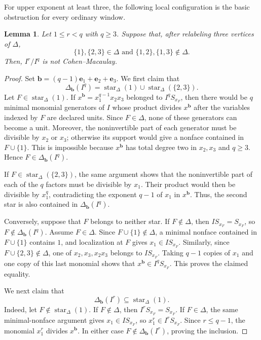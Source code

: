 \documentclass[12pt]{amsart}
\theoremstyle{plain}
\newtheorem{lemma}[theorem]{Lemma}
\theoremstyle{definition}
\theoremstyle{remark}
\begin{document}
For upper exponent at least three, the following local configuration is the
basic obstruction for every ordinary window.

\begin{lemma}\label{lem:three-vertex-obstruction}
Let $1\le r<q$ with $q\ge3$. Suppose that, after relabeling three vertices
of $\Delta$,
$$
\{1\},\{2,3\}\in\Delta
\text{ and }
\{1,2\},\{1,3\}\notin\Delta.
$$
Then, $I^r/I^q$ is not Cohen--Macaulay.
\end{lemma}

\begin{proof}
Set $\mathbf b=(q-1)\mathbf e_1+\mathbf e_2+\mathbf e_3$. We first claim
that
$$
\Delta_{\mathbf b}(I^q)
=
\operatorname{star}_\Delta(1)
\cup
\operatorname{star}_\Delta(\{2,3\}).
$$
Let $F\in\operatorname{star}_\Delta(1)$. If
$x^{\mathbf b}=x_1^{q-1}x_2x_3$ belonged to $I^qS_{x_F}$, then there would
be $q$ minimal monomial generators of $I$ whose product divides
$x^{\mathbf b}$ after the variables indexed by $F$ are declared units.
Since $F\in\Delta$, none of these generators can become a unit. Moreover,
the noninvertible part of each generator must be divisible by $x_2$ or $x_3$;
otherwise its support would give a nonface contained in $F\cup\{1\}$. This is impossible because
$x^{\mathbf b}$ has total degree two in $x_2,x_3$ and $q\ge3$. Hence
$F\in\Delta_{\mathbf b}(I^q)$.

If $F\in\operatorname{star}_\Delta(\{2,3\})$, the same argument shows
that the noninvertible part of each of the $q$ factors must be divisible by
$x_1$. Their product would then be divisible by $x_1^q$, contradicting the
exponent $q-1$ of $x_1$ in $x^{\mathbf b}$. Thus, the second star is also
contained in $\Delta_{\mathbf b}(I^q)$.

Conversely, suppose that $F$ belongs to neither star. If $F\notin\Delta$,
then $IS_{x_F}=S_{x_F}$, so $F\notin\Delta_{\mathbf b}(I^q)$. Assume
$F\in\Delta$. Since $F\cup\{1\}\notin\Delta$, a minimal nonface
contained in $F\cup\{1\}$ contains $1$, and localization at $F$ gives
$x_1\in IS_{x_F}$. Similarly, since
$F\cup\{2,3\}\notin\Delta$, one of $x_2,x_3,x_2x_3$ belongs to
$IS_{x_F}$. Taking $q-1$ copies of $x_1$ and one copy of this last monomial
shows that $x^{\mathbf b}\in I^qS_{x_F}$. This proves the claimed equality.

We next claim that
$$
\Delta_{\mathbf b}(I^r)\subseteq\operatorname{star}_\Delta(1).
$$
Indeed, let $F\notin\operatorname{star}_\Delta(1)$. If
$F\notin\Delta$, then $I^rS_{x_F}=S_{x_F}$. If $F\in\Delta$, the same
minimal-nonface argument gives $x_1\in IS_{x_F}$, so
$x_1^r\in I^rS_{x_F}$. Since $r\le q-1$, the monomial $x_1^r$ divides
$x^{\mathbf b}$. In either case $F\notin\Delta_{\mathbf b}(I^r)$,
proving the inclusion.


\end{proof}
\end{document}
